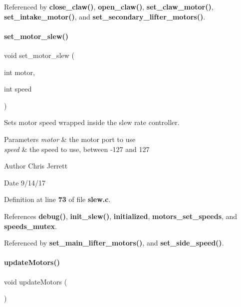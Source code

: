 Referenced by \textbf{ close\+\_\+claw()}, \textbf{ open\+\_\+claw()}, \textbf{ set\+\_\+claw\+\_\+motor()}, \textbf{ set\+\_\+intake\+\_\+motor()}, and \textbf{ set\+\_\+secondary\+\_\+lifter\+\_\+motors()}.

\mbox{\label{slew_8c_a7dff2b79dffe55fb936d977594d7c01d}} 
\paragraph{set\+\_\+motor\+\_\+slew()}
{\footnotesize\ttfamily void set\+\_\+motor\+\_\+slew (\begin{DoxyParamCaption}\item[{int}]{motor,  }\item[{int}]{speed }\end{DoxyParamCaption})}



Sets motor speed wrapped inside the slew rate controller. 


\begin{DoxyParams}{Parameters}
{\em motor} & the motor port to use \\
\hline
{\em speed} & the speed to use, between -\/127 and 127 \\
\hline
\end{DoxyParams}
\begin{DoxyAuthor}{Author}
Chris Jerrett 
\end{DoxyAuthor}
\begin{DoxyDate}{Date}
9/14/17 
\end{DoxyDate}


Definition at line \textbf{ 73} of file \textbf{ slew.\+c}.



References \textbf{ debug()}, \textbf{ init\+\_\+slew()}, \textbf{ initialized}, \textbf{ motors\+\_\+set\+\_\+speeds}, and \textbf{ speeds\+\_\+mutex}.



Referenced by \textbf{ set\+\_\+main\+\_\+lifter\+\_\+motors()}, and \textbf{ set\+\_\+side\+\_\+speed()}.

\mbox{\label{slew_8c_a807a87c5df438fde21c1e8213906695b}} 
\paragraph{update\+Motors()}
{\footnotesize\ttfamily void update\+Motors (\begin{DoxyParamCaption}{ }\end{DoxyParamCaption})}



